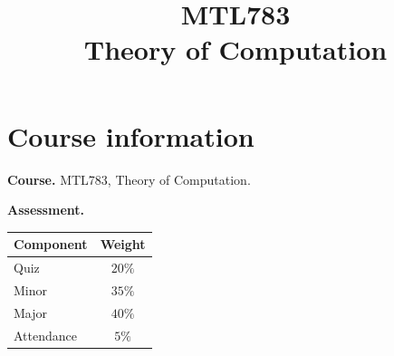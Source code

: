 \documentclass[11pt,a4paper]{article}
\title{\textbf{MTL783}\\[0.4em]
Theory of Computation}
\author{}
\date{}
\theoremstyle{definition}
\theoremstyle{remark}
\begin{document}
\maketitle
\tableofcontents
\newpage

\section*{Course information}
\textbf{Course.} MTL783, Theory of Computation.

\textbf{Assessment.}
\begin{center}
\begin{tabular}{@{}lc@{}}
\toprule
Component & Weight\\
\midrule
Quiz & $20\%$\\
Minor & $35\%$\\
Major & $40\%$\\
Attendance & $5\%$\\
\bottomrule
\end{tabular}
\end{center}










\end{document}
